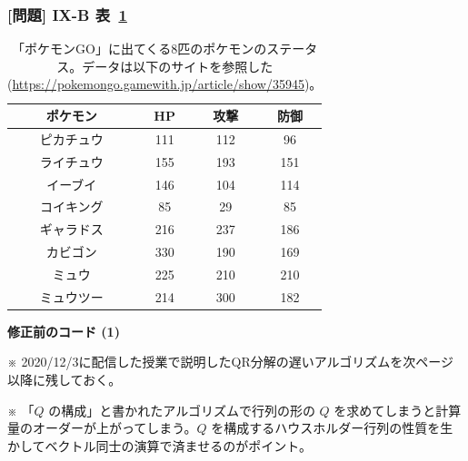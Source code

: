 \documentclass[dvipdfmx,aspectratio=169,20pt]{beamer}
\newcommand{\myfontsetting}[3]{{\fontsize{#1}{#2}\selectfont #3}}
\begin{document}
\begin{frame}
\frametitle{[問題] I\hspace{-.1em}X-B 表~\ref{table:pokemon_go}}

\myfontsetting{12pt}{12pt}{
\begin{table}[htbp]
    \centering
\begin{tabular}{|c||c|c|c|}
\hline
ポケモン & HP & 攻撃 & 防御\\
\hline
ピカチュウ  & 111 & 112 & 96\\
ライチュウ  & 155 & 193 & 151\\
イーブイ	& 146 & 104 & 114\\
コイキング	& 85 & 29 & 85\\
ギャラドス	& 216& 237 & 186\\
カビゴン	& 330 & 190 & 169\\
ミュウ	    & 225 &210 & 210\\
ミュウツー	& 214 & 300 & 182\\
\hline
\end{tabular}
\caption{
\myfontsetting{10pt}{10pt}{
「ポケモンGO」に出てくる8匹のポケモンのステータス。データは以下のサイトを参照した (\url{https://pokemongo.gamewith.jp/article/show/35945})。\label{table:pokemon_go}}
}
\end{table}
}
\end{frame}
\begin{frame}

\vspace{10mm}

\begin{center}
    \myfontsetting{36pt}{36pt}{\bf \color{myblue1} 修正前のコード (1)}
    
    \vspace{5mm}
    
    \begin{flushleft}
    \myfontsetting{12pt}{12pt}{ ※ 2020/12/3に配信した授業で説明したQR分解の遅いアルゴリズムを次ページ以降に残しておく。}
    
    \vspace{2.5mm}
    
    \myfontsetting{12pt}{12pt}{ ※ 「$Q$ の構成」と書かれたアルゴリズムで行列の形の $Q$ を求めてしまうと計算量のオーダーが上がってしまう。$Q$ を構成するハウスホルダー行列の性質を生かしてベクトル同士の演算で済ませるのがポイント。}
    \end{flushleft}
\end{center}
\end{frame}
\end{document}
